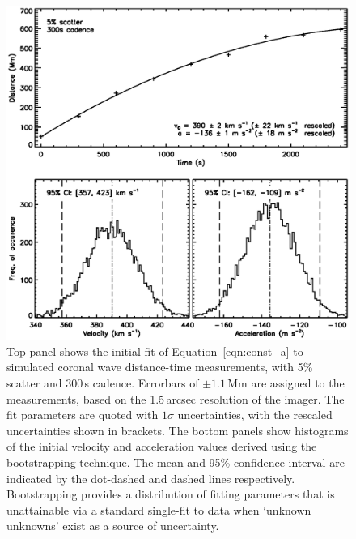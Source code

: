 \documentclass[referee]{aa}
\begin{document}
\begin{figure}
\begin{center}
\includegraphics[scale=0.45, trim=20 50 0 0, clip=true]{images/cad_boot_weight_jpb.eps}
\caption{Top panel shows the initial fit of Equation~\ref{eqn:const_a} to simulated coronal wave distance-time measurements, with 5\% scatter and 300\,s cadence. Errorbars of $\pm1.1$\,Mm are assigned to the measurements, based on the 1.5\,arcsec resolution of the imager. The fit parameters are quoted with $1\sigma$ uncertainties, with the rescaled uncertainties shown in brackets. The bottom panels show histograms of the initial velocity and acceleration values derived using the bootstrapping technique. The mean and 95\% confidence interval are indicated by the dot-dashed and dashed lines respectively. Bootstrapping provides a distribution of fitting parameters that is unattainable via a standard single-fit to data when `unknown unknowns' exist as a source of uncertainty.}
\label{cad_boot_weight}
\end{center}
\end{figure}
\end{document}
